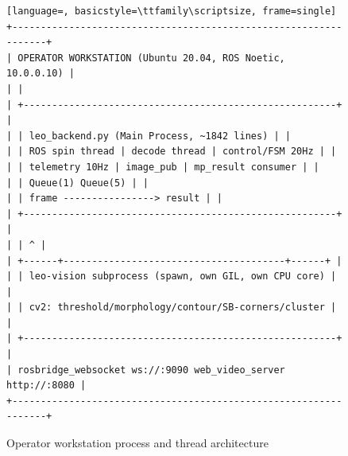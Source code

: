\begin{figure}[htbp]
\centering
\begin{lstlisting}[language=, basicstyle=\ttfamily\scriptsize, frame=single]
+-----------------------------------------------------------------+
| OPERATOR WORKSTATION (Ubuntu 20.04, ROS Noetic, 10.0.0.10) |
| |
| +-------------------------------------------------------+ |
| | leo_backend.py (Main Process, ~1842 lines) | |
| | ROS spin thread | decode thread | control/FSM 20Hz | |
| | telemetry 10Hz | image_pub | mp_result consumer | |
| | Queue(1) Queue(5) | |
| | frame ----------------> result | |
| +-------------------------------------------------------+ |
| | ^ |
| +------+---------------------------------------+------+ |
| | leo-vision subprocess (spawn, own GIL, own CPU core) | |
| | cv2: threshold/morphology/contour/SB-corners/cluster | |
| +-------------------------------------------------------+ |
| rosbridge_websocket ws://:9090 web_video_server http://:8080 |
+-----------------------------------------------------------------+
\end{lstlisting}
\caption{Operator workstation process and thread architecture}
\label{fig:process-arch}
\end{figure}

